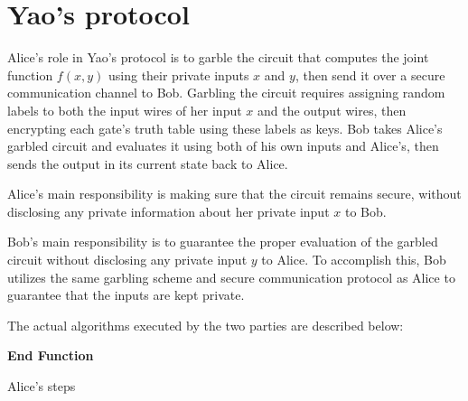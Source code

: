 \documentclass[12pt]{article}
\begin{document}
\section{Yao's protocol}

Alice's role in Yao's protocol \cite{YAO} is to garble the circuit that computes the joint function $f(x,y)$ using their private inputs $x$ and $y$, then send it over a secure communication channel to Bob. Garbling the circuit requires assigning random labels to both the input wires of her input $x$ and the output wires, then encrypting each gate's truth table using these labels as keys. Bob takes Alice's garbled circuit and evaluates it using both of his own inputs and Alice's, then sends the output in its current state back to Alice.

Alice's main responsibility is making sure that the circuit remains secure, without disclosing any private information about her private input $x$ to Bob.

Bob's main responsibility is to guarantee the proper evaluation of the garbled circuit without disclosing any private input $y$ to Alice. To accomplish this, Bob utilizes the same garbling scheme and secure communication protocol as Alice to guarantee that the inputs are kept private.

The actual algorithms executed by the two parties are described below:

\begin{algorithm}[H]
  \SetAlgoLined
    \textbf{End Function}
   \caption{Alice's steps}\label{alg:alice}
  \end{algorithm}
\end{document}
